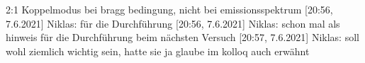 




2:1 Koppelmodus bei bragg bedingung, nicht bei emissionsspektrum
[20:56, 7.6.2021] Niklas: für die Durchführung
[20:56, 7.6.2021] Niklas: schon mal als hinweis für die Durchführung beim nächsten Versuch
[20:57, 7.6.2021] Niklas: soll wohl ziemlich wichtig sein, hatte sie ja glaube im kolloq auch erwähnt